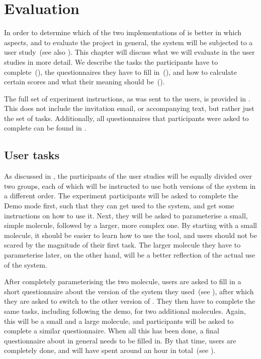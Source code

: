 \chapter{Evaluation}

In order to determine which of the two implementations of \oframp{} is better in which aspects, and to evaluate the project in general, the system will be subjected to a user study~(see also ). This chapter will discuss what we will evaluate in the user studies in more detail. We describe the tasks the participants have to complete~(), the questionnaires they have to fill in~(), and how to calculate certain scores and what their meaning should be~().

The full set of experiment instructions, as was sent to the users, is provided in . This does not include the invitation email, or accompanying text, but rather just the set of tasks. Additionally, all questionnaires that participants were asked to complete can be found in .



\section{User tasks}
As discussed in , the participants of the user studies will be equally divided over two groups, each of which will be instructed to use both versions of the system in a different order. The experiment participants will be asked to complete the Demo mode first, such that they can get used to the system, and get some instructions on how to use it. Next, they will be asked to parameterise a small, simple molecule, followed by a larger, more complex one. By starting with a small molecule, it should be easier to learn how to use the tool, and users should not be scared by the magnitude of their first task. The larger molecule they have to parameterise later, on the other hand, will be a better reflection of the actual use of the system.

After completely parameterising the two molecule, users are asked to fill in a short questionnaire about the version of the system they used~(see ), after which they are asked to switch to the other version of \oframp. They then have to complete the same tasks, including following the demo, for two additional molecules. Again, this will be a small and a large molecule, and participants will be asked to complete a similar questionnaire. When all this has been done, a final questionnaire about \oframp{} in general needs to be filled in. By that time, users are completely done, and will have spent around an hour in total~(see ).

